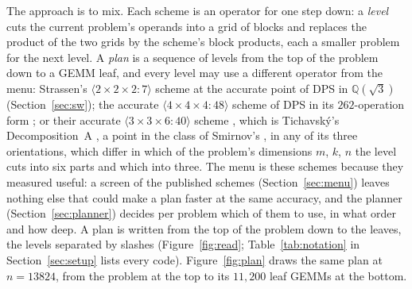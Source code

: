 \documentclass[11pt]{article}
\newcommand{\mm}[1]{\langle #1\rangle}
\begin{document}
The approach is to mix.  Each scheme is an operator for one step down: a
\emph{level} cuts the current problem's operands into a grid of blocks and
replaces the product of the two grids by the scheme's block products, each a
smaller problem for the next level.  A \emph{plan} is a sequence of levels
from the top of the problem down to a GEMM leaf, and every level may use a
different operator from the menu: Strassen's $\mm{2\times2\times2:7}$
scheme at the accurate point of DPS in $\mathbb{Q}(\sqrt3)$ \cite{DPS24} (Section~\ref{sec:sw}); the
accurate $\mm{4\times4\times4:48}$ scheme of DPS in its $262$-operation form
\cite{DPS26a,PLinOpt}; or their accurate $\mm{3\times3\times6:40}$ scheme
\cite{DPS26b}, which is Tichavsk\'y's Decomposition~A \cite{Tichavsky21}, a
point in the class of Smirnov's \cite{Smirnov13}, in any of
its three orientations, which differ in which of the problem's dimensions
$m$, $k$, $n$ the level cuts into six parts and which into three.  The menu is these schemes because they measured
useful: a screen of the published schemes (Section~\ref{sec:menu}) leaves
nothing else that could make a plan faster at the same accuracy, and the
planner (Section~\ref{sec:planner}) decides per problem which of them to use,
in what order and how deep.  A plan is written from the top of the problem
down to the leaves, the levels separated by slashes
(Figure~\ref{fig:read}; Table~\ref{tab:notation} in Section~\ref{sec:setup}
lists every code).  Figure~\ref{fig:plan} draws the same plan at $n=13824$,
from the problem at the top to its $11{,}200$ leaf GEMMs at the bottom.
\end{document}
